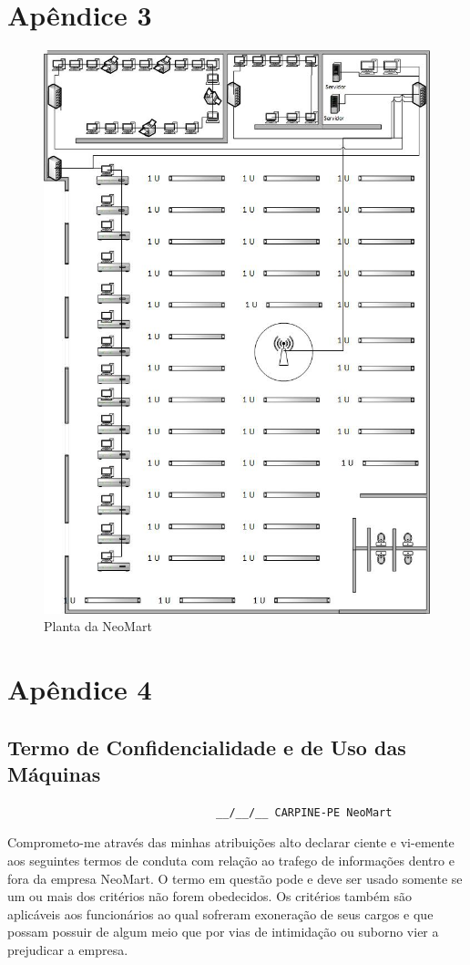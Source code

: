 \documentclass[12pt]{article}
\begin{document}
\newpage

\section{Apêndice 3} 

\begin{figure}[ht]
    \centering
    \includegraphics[height=0.7\textwidth]{planta PI II.jpg}
    \caption{Planta da NeoMart}
    \label{fig:cisco-topologia}
\end{figure}

\newpage

\section{Apêndice 4}

\subsection{Termo de Confidencialidade e de Uso das Máquinas}

\begin{verbatim}
                                __/__/__ CARPINE-PE NeoMart
\end{verbatim}

Comprometo-me através das minhas atribuições alto declarar ciente e vi-emente aos seguintes termos de conduta com relação ao trafego de informações dentro e fora da empresa NeoMart. O termo em questão pode e deve ser usado somente se um ou mais dos critérios não forem obedecidos. Os critérios também são aplicáveis aos funcionários ao qual sofreram exoneração de seus cargos e que possam possuir de algum meio que por vias de intimidação ou suborno vier a prejudicar a empresa. 
\end{document}
